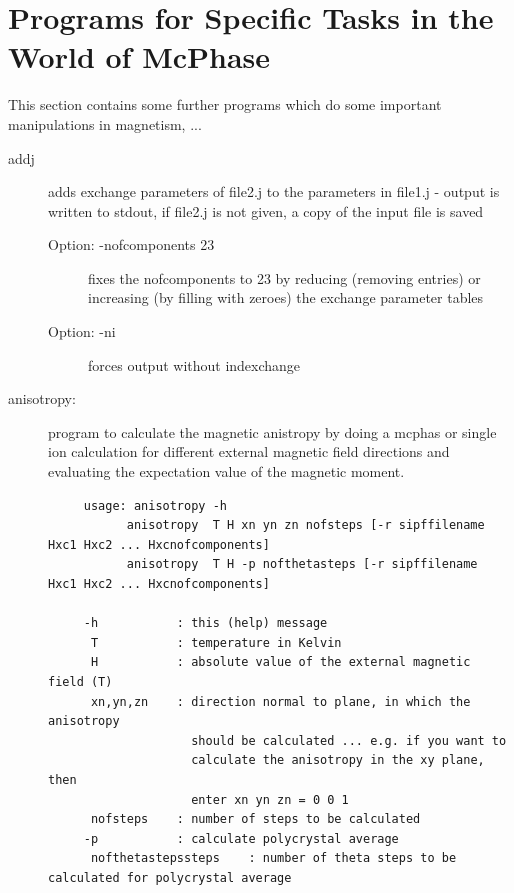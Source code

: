 \section{Programs for Specific Tasks in the World of McPhase}\label{addprog}

This section  contains some further programs which do some important manipulations
in magnetism, ...
\begin{description} 

\item [\prg addj \addcontentsline{toc}{subsubsection}{\prg addj}
file1.j file2.j:]adds exchange parameters of file2.j to the %
parameters in
file1.j - output is written to stdout, if file2.j is not given, a copy of the input file is saved 

\begin{description}
\item[Option: -nofcomponents 23] fixes the nofcomponents to 23 by 
                         reducing (removing entries) or increasing (by filling with zeroes) 
                         the exchange parameter tables
\item[Option:            -ni]  forces output without indexchange 
\end{description}
\item [\prg anisotropy:] program to calculate the magnetic anistropy
by doing a mcphas or
               single ion calculation for different external magnetic field
               directions and evaluating the expectation value of the magnetic 
               moment.
\begin{verbatim}
     usage: anisotropy -h
           anisotropy  T H xn yn zn nofsteps [-r sipffilename Hxc1 Hxc2 ... Hxcnofcomponents]
           anisotropy  T H -p nofthetasteps [-r sipffilename Hxc1 Hxc2 ... Hxcnofcomponents]

     -h           : this (help) message
      T           : temperature in Kelvin
      H           : absolute value of the external magnetic field (T)
      xn,yn,zn    : direction normal to plane, in which the anisotropy
                    should be calculated ... e.g. if you want to
                    calculate the anisotropy in the xy plane, then
                    enter xn yn zn = 0 0 1
      nofsteps    : number of steps to be calculated 
     -p           : calculate polycrystal average
      nofthetastepssteps    : number of theta steps to be calculated for polycrystal average


\end{verbatim}
\end{description}
